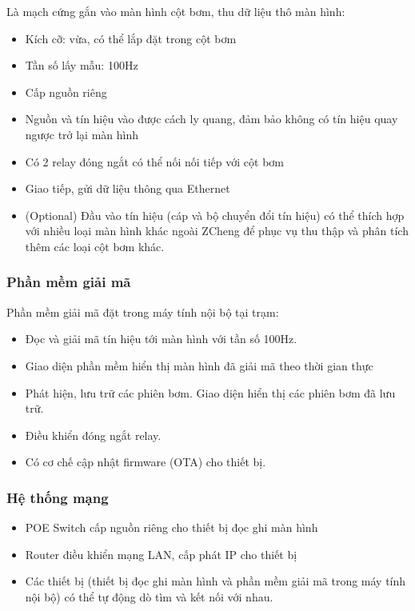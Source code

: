 \hspace{0.8cm} Là mạch cứng gắn vào màn hình cột bơm, thu dữ liệu thô màn hình:
\begin{itemize}
   
    \item Kích cỡ: vừa, có thể lắp đặt trong cột bơm
    \item Tần số lấy mẫu: 100Hz
    \item Cấp nguồn riêng
    \item Nguồn và tín hiệu vào được cách ly quang, đảm bảo không có tín hiệu quay ngược trở lại màn hình
    \item Có 2 relay đóng ngắt có thể nối nối tiếp với cột bơm
    \item Giao tiếp, gửi dữ liệu thông qua Ethernet
    \item (Optional) Đầu vào tín hiệu (cáp và bộ chuyển đổi tín hiệu) có thể thích hợp với nhiều loại màn hình khác ngoài ZCheng để phục vụ thu thập và phân tích thêm các loại cột bơm khác.
    
\end{itemize}



\subsubsection{Phần mềm giải mã}

\hspace{0.8cm} Phần mềm giải mã đặt trong máy tính nội bộ tại trạm:

\begin{itemize}
    \item Đọc và giải mã tín hiệu tới màn hình với tần số 100Hz.
    \item Giao diện phần mềm hiển thị màn hình đã giải mã theo thời gian thực
    \item Phát hiện, lưu trữ các phiên bơm. Giao diện hiển thị các phiên bơm đã lưu trữ.
    \item Điều khiển đóng ngắt relay.
    \item Có cơ chế cập nhật firmware (OTA) cho thiết bị.    
\end{itemize}

\subsubsection{Hệ thống mạng}

\begin{itemize}
    \item POE Switch cấp nguồn riêng cho thiết bị đọc ghi màn hình
    \item Router điều khiển mạng LAN, cấp phát IP cho thiết bị
    \item Các thiết bị (thiết bị đọc ghi màn hình và phần mềm giải mã trong máy tính nội bộ) có thể tự động dò tìm và kết nối với nhau.
\end{itemize}

